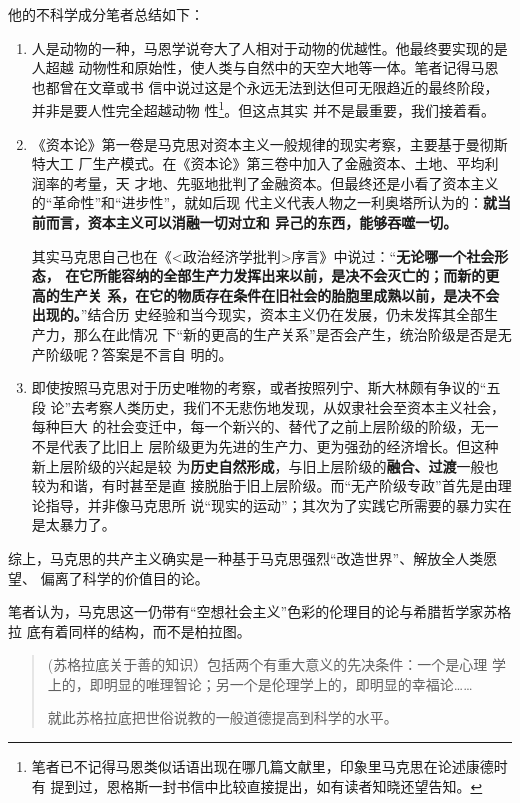 他的不科学成分笔者总结如下：
\begin{enumerate}
\item 人是动物的一种，马恩学说夸大了人相对于动物的优越性。他最终要实现的是人超越
  动物性和原始性，使人类与自然中的天空大地等一体。笔者记得马恩也都曾在文章或书
  信中说过这是个永远无法到达但可无限趋近的最终阶段，并非是要人性完全超越动物
  性\footnote{笔者已不记得马恩类似话语出现在哪几篇文献里，印象里马克思在论述康德时有
    提到过，恩格斯一封书信中比较直接提出，如有读者知晓还望告知。}。但这点其实
  并不是最重要，我们接着看。

\item 《资本论》第一卷是马克思对资本主义一般规律的现实考察，主要基于曼彻斯特大工
  厂生产模式。在《资本论》第三卷中加入了金融资本、土地、平均利润率的考量，天
  才地、先驱地批判了金融资本。但最终还是小看了资本主义的“革命性”和“进步性”，就如后现
  代主义代表人物之一利奥塔所认为的：\textbf{就当前而言，资本主义可以消融一切对立和
    异己的东西，能够吞噬一切。}

  其实马克思自己也在《<政治经济学批判>序言》中说过：“\textbf{无论哪一个社会形态，
    在它所能容纳的全部生产力发挥出来以前，是决不会灭亡的；而新的更高的生产关
    系，在它的物质存在条件在旧社会的胎胞里成熟以前，是决不会出现的。}”结合历
  史经验和当今现实，资本主义仍在发展，仍未发挥其全部生产力，那么在此情况
  下“新的更高的生产关系”是否会产生，统治阶级是否是无产阶级呢？答案是不言自
  明的。

\item 即使按照马克思对于历史唯物的考察，或者按照列宁、斯大林颇有争议的“五段
  论”去考察人类历史，我们不无悲伤地发现，从奴隶社会至资本主义社会，每种巨大
  的社会变迁中，每一个新兴的、替代了之前上层阶级的阶级，无一不是代表了比旧上
  层阶级更为先进的生产力、更为强劲的经济增长。但这种新上层阶级的兴起是较
  为\textbf{历史自然形成}，与旧上层阶级的\textbf{融合、过渡}一般也较为和谐，有时甚至是直
  接脱胎于旧上层阶级。而“无产阶级专政”首先是由理论指导，并非像马克思所
  说“现实的运动”；其次为了实践它所需要的暴力实在是太暴力了。
\end{enumerate}

综上，马克思的共产主义确实是一种基于马克思强烈“改造世界”、解放全人类愿望、
偏离了科学的价值目的论。

笔者认为，马克思这一仍带有“空想社会主义”色彩的伦理目的论与希腊哲学家苏格拉
底有着同样的结构，而不是柏拉图。
\begin{quotation}
  (苏格拉底关于善的知识）包括两个有重大意义的先决条件：一个是心理
  学上的，即明显的唯理智论；另一个是伦理学上的，即明显的幸福论……

  就此苏格拉底把世俗说教的一般道德提高到科学的水平。\cite[113]{wendeerban}
\end{quotation}

